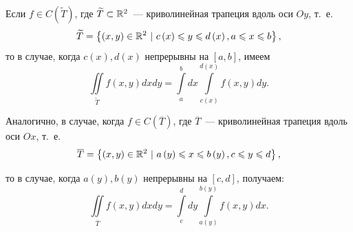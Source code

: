 \documentclass[../../main.tex]{subfiles}
\begin{document}
\begin{crl*}
	Если $ f \in C( \widetilde{T} ) $, 
	где $ \widetilde{T} \subset \mathbb{R}^2 $~---  
	криволинейная трапеция вдоль оси $ Oy $, т.~е. 
	\begin{equation}
	\label{lec_13, num_19}
	\widetilde{T} = \left\lbrace 
	\left( x, y\right) \in \mathbb{R}^2\ | 
	\ c \left( x \right) \leqslant y \leqslant d \left( x \right),
	 a \leqslant x \leqslant b \right\rbrace,
	 \end{equation}
	 то в случае, когда $c \left( x \right), d \left( x \right) $  непрерывны на 
	 $ \left[ a, b \right] $, имеем
	 \begin{equation}
	 \label{lec_13, num_20}
	 \iint\limits_{\widetilde{T}} f \left( x, y \right)  dxdy = 
	 \int\limits_a^b dx \int\limits_{c \left( x \right) }^{d \left( x \right)} 
	 f \left( x, y \right) dy.
	 \end{equation}
	 
	 Аналогично, в случае, когда $ f \in C ( \overline{T} ) $, 
	 где $ \overline{T} $~---  криволинейная трапеция вдоль оси $ Ox $, т.~е. 
	 \begin{equation}
	 \label{lec_13, num_21}
	 \overline{T} = \left\lbrace 
	 \left( x, y\right) \in \mathbb{R}^2\ | 
	 \ a \left( y \right) \leqslant x \leqslant b \left( y \right),
	 c \leqslant y \leqslant d \right\rbrace,
	 \end{equation}
	 
	 то в случае, когда $ a \left( y \right), b \left( y \right) $
	 непрерывны на $ \left[ c, d \right] $, получаем:
	 \begin{equation}
	 \label{lec_13, num_22}
	 \iint\limits_{\overline{T}} f \left( x, y \right) dx dy = 
	 \int\limits_c^d dy 
	 \int\limits_{a \left( y \right) } ^ 
	 {b \left( y \right) } f \left( x, y \right) dx.
	 \end{equation}
\end{crl*}
\end{document}
